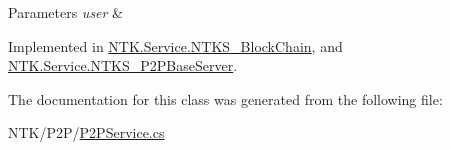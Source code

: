 \begin{DoxyParams}{Parameters}
{\em user} & \\
\hline
\end{DoxyParams}


Implemented in \mbox{\hyperlink{class_n_t_k_1_1_service_1_1_n_t_k_s___block_chain_aa3fedcf07d1cac1d60215c425930b1f0}{N\+T\+K.\+Service.\+N\+T\+K\+S\+\_\+\+Block\+Chain}}, and \mbox{\hyperlink{class_n_t_k_1_1_service_1_1_n_t_k_s___p2_p_base_server_a328bbae01750cee242ecf00a4d0db350}{N\+T\+K.\+Service.\+N\+T\+K\+S\+\_\+\+P2\+P\+Base\+Server}}.



The documentation for this class was generated from the following file\+:\begin{DoxyCompactItemize}
\item 
N\+T\+K/\+P2\+P/\mbox{\hyperlink{_p2_p_service_8cs}{P2\+P\+Service.\+cs}}\end{DoxyCompactItemize}
